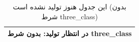 \begin{table}[H]
\centering
\caption{این جدول هنوز تولید نشده است (بدون شرط three\_class)}
\label{tab:v2-three-class}
\begin{tabular}{l}
\toprule
در انتظار تولید: بدون شرط three\_class \\
\bottomrule
\end{tabular}
\end{table}
